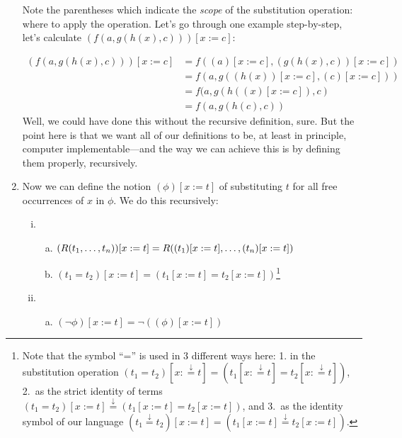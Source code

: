 \begin{enumerate}[\thesection.1]
\begin{enumerate}[(i)]
			\end{enumerate} 
			
	Note the parentheses which indicate the \emph{scope} of the substitution operation: where to apply the operation. Let's go through one example step-by-step, let's calculate $(f(a, g(h(x),c)))[x:=c]$:
	
	\begin{align*}
	(f(a, g(h(x),c)))[x:=c]&=f((a)[x:=c], (g(h(x),c))[x:=c])\\
	&=f(a, g((h(x))[x:=c], (c)[x:=c]))\\
	&=f(a,g(h((x)[x:=c]), c)\\
	&=f(a,g(h(c),c))
	\end{align*}
Well, we could have done this without the recursive definition, sure. But the point here is that we want all of our definitions to be, at least in principle, computer implementable---and the way we can achieve this is by defining them properly, recursively.

	\item	Now we can define the notion $(\phi)[x:=t]$ of substituting $t$ for all free occurrences of $x$ in $\phi$. We do this recursively:	
		\begin{enumerate}[(i)]
	
			\item \begin{enumerate}[(a)] 
			
					\item $(R(t_1, \mathellipsis, t_n))[x:=t]=R((t_1)[x:=t], \mathellipsis, (t_n)[x:=t])$

					\item $(t_1=t_2)[x:=t]=(t_1[x:=t]=t_2[x:=t])$\footnote{%
						  Note that the symbol ``='' is used in 3 different ways
						  here: 1. in the substitution operation $(t_1=t_2)[x:\overset{\downarrow}{=}t]=(t_1[x:\overset{\downarrow}{=}t]=t_2[x:\overset{\downarrow}{=}t])$, 2.\
						  as the strict identity of terms $(t_1=t_2)[x:=t]\overset{\downarrow}{=}(t_1[x:=t]=t_2[x:=t])$, and
						  3.\ as the identity symbol of our language $(t_1\overset{\downarrow}{=}t_2)[x:=t]=(t_1[x:=t]\overset{\downarrow}{=}t_2[x:=t])$.}

			\end{enumerate}
			
			\item \begin{enumerate}[(a)] 

			\item $(\neg\phi)[x:=t]=\neg((\phi)[x:=t])$


\end{enumerate}
\end{enumerate}
\end{enumerate}
